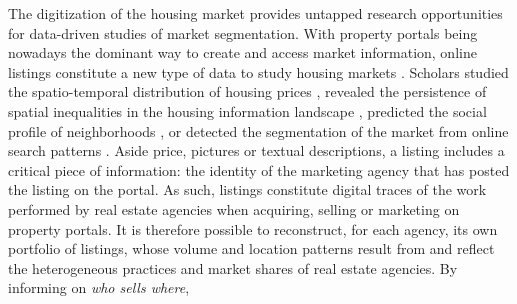 The digitization of the housing market \cite{raehousing2024} provides untapped research opportunities for data-driven studies of market segmentation. With property portals being nowadays the dominant way to create and access market information, online listings constitute a new type of data to study housing markets \cite{sawyer1999ict, boeing2017new, boulay2021moving}. Scholars studied the spatio-temporal distribution of housing prices \cite{yao2018mapping,adolfsen_segmentation_2022}, revealed the persistence of spatial inequalities in the housing information landscape \cite{boeing2020online}, predicted the social profile of neighborhoods \cite{delmelle2021language}, or detected the segmentation of the market from online search patterns \cite{rae2015online}.
Aside price, pictures or textual descriptions, a listing includes a critical piece of information: the identity of the marketing agency that has posted the listing on the portal. As such, listings constitute digital traces \cite{salganikbit2017} of the work performed by real estate agencies when acquiring, selling or marketing on property portals. It is therefore possible to reconstruct, for each agency, its own portfolio of listings, whose volume and location patterns result from and reflect the heterogeneous practices and market shares of real estate agencies. By informing on \textit{who sells where}, 
